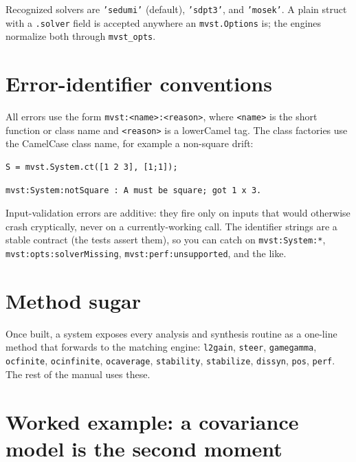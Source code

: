 \documentclass[11pt,oneside]{report}
\newcommand{\code}[1]{\texttt{#1}}
\begin{document}
Recognized solvers are \code{'sedumi'} (default), \code{'sdpt3'}, and \code{'mosek'}. A plain
struct with a \code{.solver} field is accepted anywhere an \code{mvst.Options} is; the
engines normalize both through \code{mvst\_opts}.

\hypertarget{error-identifier-conventions}{%
\section{Error-identifier conventions}\label{error-identifier-conventions}}

All errors use the form \code{mvst:\textless{}name\textgreater{}:\textless{}reason\textgreater{}}, where \code{\textless{}name\textgreater{}} is the short
function or class name and \code{\textless{}reason\textgreater{}} is a lowerCamel tag. The class factories
use the CamelCase class name, for example a non-square drift:

\begin{lstlisting}[style=matlabstyle]
S = mvst.System.ct([1 2 3], [1;1]);
\end{lstlisting}

\begin{lstlisting}[style=outputstyle]
mvst:System:notSquare : A must be square; got 1 x 3.
\end{lstlisting}

Input-validation errors are additive: they fire only on inputs that would
otherwise crash cryptically, never on a currently-working call. The identifier
strings are a stable contract (the tests assert them), so you can catch on
\code{mvst:System:*}, \code{mvst:opts:solverMissing}, \code{mvst:perf:unsupported}, and the
like.

\hypertarget{method-sugar}{%
\section{Method sugar}\label{method-sugar}}

Once built, a system exposes every analysis and synthesis routine as a one-line
method that forwards to the matching engine: \code{l2gain}, \code{steer},
\code{gamegamma}, \code{ocfinite}, \code{ocinfinite}, \code{ocaverage}, \code{stability}, \code{stabilize},
\code{dissyn}, \code{pos}, \code{perf}. The rest of the manual uses these.

\hypertarget{worked-example-a-covariance-model-is-the-second-moment}{%
\section{Worked example: a covariance model is the second moment}\label{worked-example-a-covariance-model-is-the-second-moment}}
\end{document}

